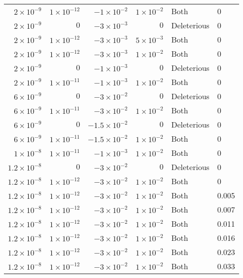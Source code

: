 \begin{table}
\begin{tabular}{rrrrll}
  $2 \times 10^{-9}$ & $1 \times 10^{-12}$ & $-1 \times 10^{-2}$ & $1 \times 10^{-2}$ & Both & 0 \\ 
  $2 \times 10^{-9}$ & $0$ & $-3 \times 10^{-3}$ & $0$ & Deleterious & 0 \\ 
  $2 \times 10^{-9}$ & $1 \times 10^{-12}$ & $-3 \times 10^{-3}$ & $5 \times 10^{-3}$ & Both & 0 \\ 
  $2 \times 10^{-9}$ & $1 \times 10^{-12}$ & $-3 \times 10^{-3}$ & $1 \times 10^{-2}$ & Both & 0 \\ 
  $2 \times 10^{-9}$ & $0$ & $-1 \times 10^{-3}$ & $0$ & Deleterious & 0 \\ 
  $2 \times 10^{-9}$ & $1 \times 10^{-11}$ & $-1 \times 10^{-3}$ & $1 \times 10^{-2}$ & Both & 0 \\ 
  $6 \times 10^{-9}$ & $0$ & $-3 \times 10^{-2}$ & $0$ & Deleterious & 0 \\ 
  $6 \times 10^{-9}$ & $1 \times 10^{-11}$ & $-3 \times 10^{-2}$ & $1 \times 10^{-2}$ & Both & 0 \\ 
  $6 \times 10^{-9}$ & $0$ & $-1.5 \times 10^{-2}$ & $0$ & Deleterious & 0 \\ 
  $6 \times 10^{-9}$ & $1 \times 10^{-11}$ & $-1.5 \times 10^{-2}$ & $1 \times 10^{-2}$ & Both & 0 \\ 
  $1 \times 10^{-8}$ & $1 \times 10^{-11}$ & $-1 \times 10^{-3}$ & $1 \times 10^{-2}$ & Both & 0 \\ 
  $1.2 \times 10^{-8}$ & $0$ & $-3 \times 10^{-2}$ & $0$ & Deleterious & 0 \\ 
  $1.2 \times 10^{-8}$ & $1 \times 10^{-12}$ & $-3 \times 10^{-2}$ & $1 \times 10^{-2}$ & Both & 0 \\ 
  $1.2 \times 10^{-8}$ & $1 \times 10^{-12}$ & $-3 \times 10^{-2}$ & $1 \times 10^{-2}$ & Both & 0.005 \\ 
  $1.2 \times 10^{-8}$ & $1 \times 10^{-12}$ & $-3 \times 10^{-2}$ & $1 \times 10^{-2}$ & Both & 0.007 \\ 
  $1.2 \times 10^{-8}$ & $1 \times 10^{-12}$ & $-3 \times 10^{-2}$ & $1 \times 10^{-2}$ & Both & 0.011 \\ 
  $1.2 \times 10^{-8}$ & $1 \times 10^{-12}$ & $-3 \times 10^{-2}$ & $1 \times 10^{-2}$ & Both & 0.016 \\ 
  $1.2 \times 10^{-8}$ & $1 \times 10^{-12}$ & $-3 \times 10^{-2}$ & $1 \times 10^{-2}$ & Both & 0.023 \\ 
  $1.2 \times 10^{-8}$ & $1 \times 10^{-12}$ & $-3 \times 10^{-2}$ & $1 \times 10^{-2}$ & Both & 0.033 \\ 

\end{tabular}
\end{table}

